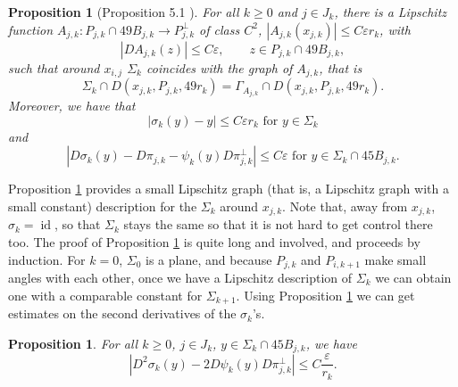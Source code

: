 \documentclass[11pt, twoside, leqno]{article}
\numberwithin{equation}{section}
\theoremstyle{plain}
\newtheorem{prop}[thm]{Proposition}
\theoremstyle{definition}
\newcommand{\R}{\mathbb{R}}
\newcommand{\e}{\varepsilon} %
\begin{document}
\begin{prop} [Proposition 5.1 \cite{davidtoro}] \label{chap5dt}
For all $k \geq 0$ and $j \in J_k$, there is a Lipschitz function $A_{j,k} \colon P_{j,k} \cap 49B_{j,k} \to P_{j,k}^{\perp}$ of class $C^2$, $|A_{j,k}(x_{j,k})|\leq C \e r_k$, with 
\begin{equation}
\left| DA_{j,k}(z)\right| \leq C \e, \qquad z \in P_{j,k} \cap 49B_{j,k},
\end{equation}
such that around $x_{i,j}$ $\Sigma_k$ coincides with the graph of $A_{j,k}$, that is
\begin{equation} \label{graph}
\Sigma_k \cap D(x_{j,k},P_{j,k},49r_k)=\Gamma_{A_{j,k}}\cap D(x_{j,k},P_{j,k},49r_k).
\end{equation}
Moreover, we have that 
\begin{equation}
|\sigma_k(y)-y| \leq C \e r_k \text{ for $y \in \Sigma_k$}
\end{equation}
and%
\begin{equation}
\left| D\sigma_k(y)-D\pi_{j,k}-\psi_k(y)D\pi^{\perp}_{j,k}\right| \leq C\e \text{ for $y \in \Sigma_k \cap 45B_{j,k}$}.
\end{equation}
\end{prop}
Proposition \ref{chap5dt} provides a small Lipschitz graph (that is, a Lipschitz graph with a small constant) description for the $\Sigma_k$ around $x_{j,k}$. Note that, away from $x_{j,k}$, $\sigma_k=\operatorname{id}$, so that $\Sigma_k$ stays the same so that it is not hard to get control there too. 
The proof of Proposition \ref{chap5dt} is quite long and involved, and proceeds by induction. For $k=0$, $\Sigma_0$ is a plane, and because $P_{j,k}$ and $P_{i,k+1}$ make small angles with each other, once we have a Lipschitz description of $\Sigma_k$ we can obtain one with a comparable constant for $\Sigma_{k+1}$.
Using Proposition \ref{chap5dt} we can get estimates on the second derivatives of the $\sigma_k$'s.

\begin{prop} \label{chap5}
For all $k \geq 0$, $j \in J_k$, $y \in \Sigma_k \cap 45B_{j,k}$,  we have
\begin{equation}
\left|D^2\sigma_k(y) - 2 D\psi_k(y)D\pi^{\perp}_{j,k}\right| \leq C\frac{\e}{r_k}.
\end{equation}
\end{prop}
\end{document}
